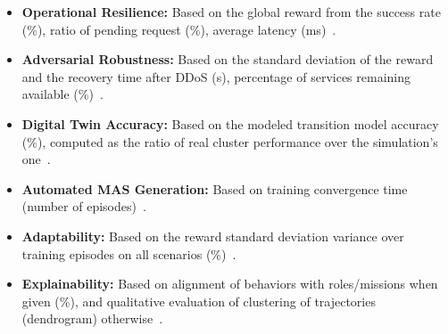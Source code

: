 \documentclass[conference]{IEEEtran}
\makeatletter
\renewcommand\paragraph{\@startsection{paragraph}{5}{\z@}%
  {3.25ex \@plus1ex \@minus.2ex}%
  {-1em}%
  {\normalfont\normalsize\bfseries}}
\makeatother
\begin{document}
\begin{itemize}
    \item \textbf{Operational Resilience:} Based on the global reward from the success rate (\%), ratio of pending request (\%), average latency (ms)~\cite{burns2016borg}.
    \item \textbf{Adversarial Robustness:} Based on the standard deviation of the reward and the recovery time after DDoS (s), percentage of services remaining available (\%)~\cite{koller2019ddos}.
    \item \textbf{Digital Twin Accuracy:} Based on the modeled transition model accuracy (\%), computed as the ratio of real cluster performance over the simulation's one~\cite{moreno2018kubernetes}.
    \item \textbf{Automated MAS Generation:} Based on training convergence time (number of episodes)~\cite{smith2021autoscaling}.
    \item \textbf{Adaptability:} Based on the reward standard deviation variance over training episodes on all scenarios (\%)~\cite{aware2023}.
    \item \textbf{Explainability:} Based on alignment of behaviors with roles/missions when given (\%), and qualitative evaluation of clustering of trajectories (dendrogram) otherwise~\cite{hubner2002moise}.
\end{itemize}



\end{document}
